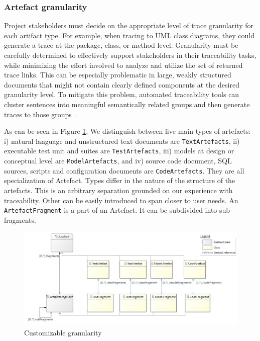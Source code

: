 
\subsubsection{Artefact granularity}\label{sec:granularity}

Project stakeholders must decide on the appropriate level of trace granularity for each artifact type. For example, when tracing to UML class diagrams, they could generate a trace at the package, class, or method level.
Granularity must be carefully determined to effectively support stakeholders in their traceability tasks, while minimizing the effort involved to analyze and utilize the set of returned trace links. This can be especially problematic
in large, weakly structured documents that might not contain clearly defined components at the desired granularity level. To mitigate this problem, automated traceability tools can cluster sentences into meaningful semantically related groups and then generate traces to those groups~\cite{clelandhuang2007bestPracticeForAutomatedTraceability}.

As can be seen in Figure \ref{fig:mm-granularity}, We distinguish between five main types of artefacts: i) natural language and unstructured text documents are \texttt{TextArtefacts}, ii) executable test unit and suites are \texttt{TestArtefacts}, iii) models at design or conceptual level are \texttt{ModelArtefacts}, and iv) source code document, SQL sources, scripts and configuration documents are \texttt{CodeArtefacts}. They are all specialization of Artefact. Types differ in the nature of the structure of the artefacts. This is an arbitrary separation grounded on our experience with traceability. Other can be easily introduced to span closer to user needs.
An \texttt{ArtefactFragment} is a part of an Artefact. It can be subdivided into sub-fragments.
\begin{figure}[ht]
	\centering
	\includegraphics[width=.99\linewidth]{images/granularity.jpg}
	\caption{Customizable granularity}
	\label{fig:mm-granularity}
\end{figure}


